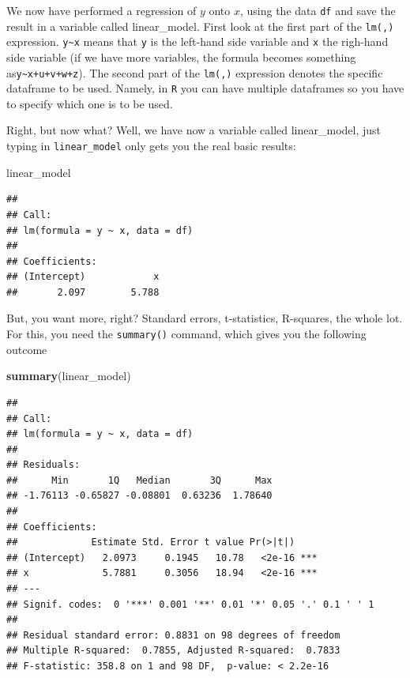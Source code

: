 \documentclass[]{article}
\newenvironment{Shaded}{\begin{snugshade}}{\end{snugshade}}
\newcommand{\KeywordTok}[1]{\textcolor[rgb]{0.13,0.29,0.53}{\textbf{#1}}}
\newcommand{\NormalTok}[1]{#1}
\theoremstyle{definition}
\theoremstyle{definition}
\theoremstyle{definition}
\theoremstyle{remark}
\begin{document}
We now have performed a regression of \(y\) onto \(x\), using the data
\texttt{df} and save the result in a variable called linear\_model.
First look at the first part of the \texttt{lm(,)} expression.
\texttt{y\textasciitilde{}x} means that \texttt{y} is the left-hand side
variable and \texttt{x} the righ-hand side variable (if we have more
variables, the formula becomes something
as\texttt{y\textasciitilde{}x+u+v+w+z}). The second part of the
\texttt{lm(,)} expression denotes the specific dataframe to be used.
Namely, in \texttt{R} you can have multiple dataframes so you have to
specify which one is to be used.

Right, but now what? Well, we have now a variable called linear\_model,
just typing in \texttt{linear\_model} only gets you the real basic
results:

\begin{Shaded}
\begin{Highlighting}[]
\NormalTok{linear_model}
\end{Highlighting}
\end{Shaded}

\begin{verbatim}
## 
## Call:
## lm(formula = y ~ x, data = df)
## 
## Coefficients:
## (Intercept)            x  
##       2.097        5.788
\end{verbatim}

But, you want more, right? Standard errors, t-statistics, R-squares, the
whole lot. For this, you need the \texttt{summary()} command, which
gives you the following outcome

\begin{Shaded}
\begin{Highlighting}[]
\KeywordTok{summary}\NormalTok{(linear_model)}
\end{Highlighting}
\end{Shaded}

\begin{verbatim}
## 
## Call:
## lm(formula = y ~ x, data = df)
## 
## Residuals:
##      Min       1Q   Median       3Q      Max 
## -1.76113 -0.65827 -0.08801  0.63236  1.78640 
## 
## Coefficients:
##             Estimate Std. Error t value Pr(>|t|)    
## (Intercept)   2.0973     0.1945   10.78   <2e-16 ***
## x             5.7881     0.3056   18.94   <2e-16 ***
## ---
## Signif. codes:  0 '***' 0.001 '**' 0.01 '*' 0.05 '.' 0.1 ' ' 1
## 
## Residual standard error: 0.8831 on 98 degrees of freedom
## Multiple R-squared:  0.7855, Adjusted R-squared:  0.7833 
## F-statistic: 358.8 on 1 and 98 DF,  p-value: < 2.2e-16
\end{verbatim}
\end{document}
